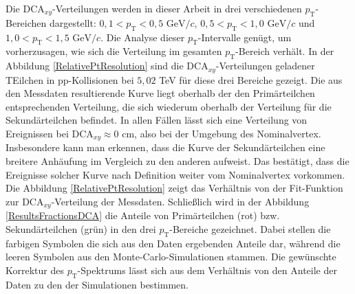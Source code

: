 Die $\mathrm{DCA}_{xy}$-Verteilungen werden in dieser Arbeit in drei verschiedenen $p_{\mathrm{T}}$-Bereichen dargestellt: $0,1 < p_{\mathrm{T}} < 0,5$ $\mathrm{GeV}/c$, $0,5 < p_{\mathrm{T}} < 1,0$ $\mathrm{GeV}/c$ und $1,0 < p_{\mathrm{T}} < 1,5$ $\mathrm{GeV}/c$. Die Analyse dieser $p_{\mathrm{T}}$-Intervalle genügt, um vorherzusagen, wie sich die Verteilung im gesamten $p_{\mathrm{T}}$-Bereich verhält. In der Abbildung \ref{RelativePtResolution} sind die $\mathrm{DCA}_{xy}$-Verteilungen geladener TEilchen in pp-Kollisionen bei $5,02$ TeV für diese drei Bereiche gezeigt. Die aus den Messdaten resultierende Kurve liegt oberhalb der den Primärteilchen entsprechenden Verteilung, die sich wiederum oberhalb der Verteilung für die Sekundärteilchen befindet. In allen Fällen lässt sich eine Verteilung von Ereignissen bei $\mathrm{DCA}_{xy} \approx 0$ cm, also bei der Umgebung des Nominalvertex. Insbesondere kann man erkennen, dass die Kurve der Sekundärteilchen eine breitere Anhäufung im Vergleich zu den anderen aufweist. Das bestätigt, dass die Ereignisse solcher Kurve nach Definition weiter vom Nominalvertex vorkommen. Die Abbildung \ref{RelativePtResolution} zeigt das Verhältnis von der Fit-Funktion zur $\mathrm{DCA}_{xy}$-Verteilung der Messdaten. Schließlich wird in der Abbildung \ref{ResultsFractionsDCA} die Anteile von Primärteilchen (rot) bzw. Sekundärteilchen (grün) in den drei $p_{\mathrm{T}}$-Bereiche gezeichnet. Dabei stellen die farbigen Symbolen die sich aus den Daten ergebenden Anteile dar, während die leeren Symbolen aus den Monte-Carlo-Simulationen stammen. Die gewünschte Korrektur des $p_{\mathrm{T}}$-Spektrums lässt sich aus dem Verhältnis von den Anteile der Daten zu den der Simulationen bestimmen.